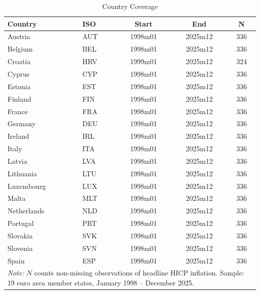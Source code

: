\begin{table}[htbp]
  \centering
  \caption{Country Coverage}
  \label{tab:coverage}
  \begin{tabular}{llccc}
    \toprule
    Country & ISO & Start & End & N \\
    \midrule
    Austria & AUT & 1998m01 & 2025m12 & 336 \\
    Belgium & BEL & 1998m01 & 2025m12 & 336 \\
    Croatia & HRV & 1999m01 & 2025m12 & 324 \\
    Cyprus & CYP & 1998m01 & 2025m12 & 336 \\
    Estonia & EST & 1998m01 & 2025m12 & 336 \\
    Finland & FIN & 1998m01 & 2025m12 & 336 \\
    France & FRA & 1998m01 & 2025m12 & 336 \\
    Germany & DEU & 1998m01 & 2025m12 & 336 \\
    Ireland & IRL & 1998m01 & 2025m12 & 336 \\
    Italy & ITA & 1998m01 & 2025m12 & 336 \\
    Latvia & LVA & 1998m01 & 2025m12 & 336 \\
    Lithuania & LTU & 1998m01 & 2025m12 & 336 \\
    Luxembourg & LUX & 1998m01 & 2025m12 & 336 \\
    Malta & MLT & 1998m01 & 2025m12 & 336 \\
    Netherlands & NLD & 1998m01 & 2025m12 & 336 \\
    Portugal & PRT & 1998m01 & 2025m12 & 336 \\
    Slovakia & SVK & 1998m01 & 2025m12 & 336 \\
    Slovenia & SVN & 1998m01 & 2025m12 & 336 \\
    Spain & ESP & 1998m01 & 2025m12 & 336 \\
    \midrule
    \multicolumn{5}{l}{\footnotesize\textit{Note:} $N$ counts non-missing observations of headline HICP inflation. Sample: 19 euro area member states, January 1998 -- December 2025.}
    \bottomrule
  \end{tabular}
\end{table}
